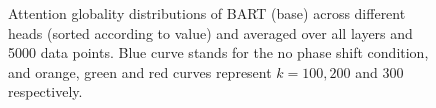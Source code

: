 \documentclass[letterpaper, 12pt]{report}
\begin{document}
\begin{figure}
    \centering
    \caption{Attention globality distributions of BART (base) across different heads (sorted according to value) and averaged over all layers and 5000 data points. Blue curve stands for the no phase shift condition, and orange, green and red curves represent $k=100,200$ and $300$ respectively.}
    \label{fig:globality_bart-base}
\end{figure}
\end{document}
